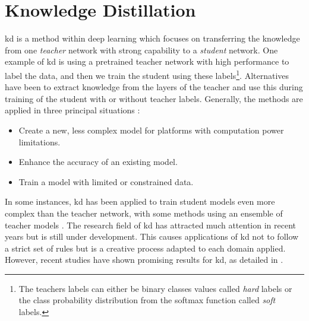 \section{Knowledge Distillation} \label{knowledge distillation}
    \gls{kd} is a method within deep learning which focuses on transferring the knowledge from one \textit{teacher} network with strong capability to a \textit{student} network. One example of \gls{kd} is using a pretrained teacher network with high performance to label the data, and then we train the student using these labels\footnote{The teachers labels can either be binary classes values called \textit{hard} labels or the class probability distribution from the softmax function called \textit{soft} labels.}. Alternatives have been to extract knowledge from the layers of the teacher and use this during training of the student with or without teacher labels. Generally, the methods are applied in three principal situations \cite{abbasi2020modeling}:
    \begin{itemize}
        \item Create a new, less complex model for platforms with computation power limitations.
        \item Enhance the accuracy of an existing model.
        \item Train a model with limited or constrained data.
    \end{itemize}
    
    In some instances, \gls{kd} has been applied to train student models even more complex than the teacher network, with some methods using an ensemble of teacher models \cite{abbasi2020modeling}. The research field of \gls{kd} has attracted much attention in recent years but is still under development. This causes applications of \gls{kd} not to follow a strict set of rules but is a creative process adapted to each domain applied. However, recent studies have shown promising results for \gls{kd}, as detailed in  \citet{alkhulaifi2021knowledge}.
  
    
    
    
    


    



